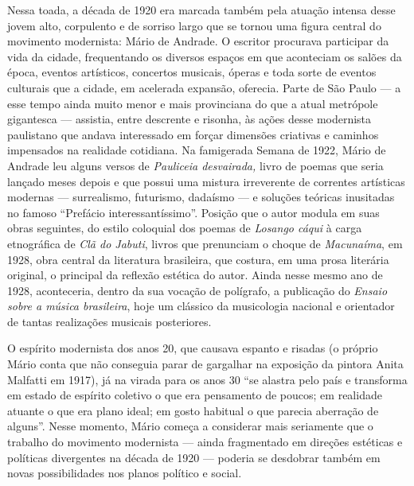 Nessa toada, a década de 1920 era marcada também pela atuação intensa
desse jovem alto, corpulento e de sorriso largo que se tornou uma figura
central do movimento modernista: Mário de Andrade. O escritor procurava
participar da vida da cidade, frequentando os diversos espaços em que
aconteciam os salões da época, eventos artísticos, concertos musicais,
óperas e toda sorte de eventos culturais que a cidade, em acelerada
expansão, oferecia. Parte de São Paulo --- a esse tempo ainda muito menor
e mais provinciana do que a atual metrópole gigantesca --- assistia,
entre descrente e risonha, às ações desse modernista paulistano que
andava interessado em forçar dimensões criativas e caminhos impensados
na realidade cotidiana. Na famigerada Semana de 1922, Mário de Andrade
leu alguns versos de \emph{Pauliceia desvairada,} livro de poemas que
seria lançado meses depois e que possui uma mistura irreverente de
correntes artísticas modernas --- surrealismo, futurismo, dadaísmo --- e
soluções teóricas inusitadas no famoso ``Prefácio interessantíssimo''.
Posição que o autor modula em suas obras seguintes, do estilo coloquial
dos poemas de \emph{Losango cáqui} à carga etnográfica de \emph{Clã do
Jabuti}, livros que prenunciam o choque de \emph{Macunaíma}, em 1928,
obra central da literatura brasileira, que costura, em uma prosa
literária original, o principal da reflexão estética do autor. Ainda
nesse mesmo ano de 1928, aconteceria, dentro da sua vocação de
polígrafo, a publicação do \emph{Ensaio sobre a música brasileira}, hoje
um clássico da musicologia nacional e orientador de tantas realizações
musicais posteriores.

O espírito modernista dos anos 20, que causava espanto e risadas (o
próprio Mário conta que não conseguia parar de gargalhar na exposição da
pintora Anita Malfatti em 1917), já na virada para os anos 30 ``se
alastra pelo país e transforma em estado de espírito coletivo o que era
pensamento de poucos; em realidade atuante o que era plano ideal; em
gosto habitual o que parecia aberração de alguns''. Nesse momento, Mário
começa a considerar mais seriamente que o trabalho do movimento
modernista --- ainda fragmentado em direções estéticas e políticas
divergentes na década de 1920 --- poderia se desdobrar também em novas
possibilidades nos planos político e social.

